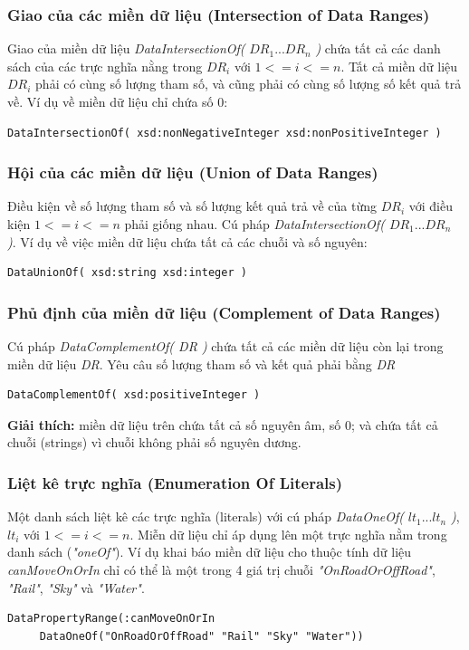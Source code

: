 \subsubsection{Giao của các miền dữ liệu (Intersection of Data Ranges)}
Giao của miền dữ liệu \textit{DataIntersectionOf(} $DR_{1} ... DR_{n}$ \textit{)}  chứa tất cả các danh sách của các trực nghĩa nằng trong $DR_{i}$ với $1 <= i <= n$. Tất cả miền dữ liệu $DR_{i}$ phải có cùng số lượng tham số, và cũng phải có cùng số lượng số kết quả trả về. Ví dụ về miền dữ liệu chỉ chứa số 0:
\begin{verbatim}
DataIntersectionOf( xsd:nonNegativeInteger xsd:nonPositiveInteger )
\end{verbatim}

\subsubsection{Hội của các miền dữ liệu (Union of Data Ranges)}
Điều kiện về số lượng tham số và số lượng kết quả trả về của từng $DR_{i}$ với điều kiện $1 <= i <= n$ phải giống nhau. Cú pháp \textit{DataIntersectionOf( $DR_{1} ... DR_{n}$ )}. Ví dụ về việc miền dữ liệu chứa tất cả các chuỗi và số nguyên:
\begin{verbatim}
DataUnionOf( xsd:string xsd:integer )
\end{verbatim}

\subsubsection{Phủ định của miền dữ liệu (Complement of Data Ranges)}
Cú pháp \textit{DataComplementOf( DR )} chứa tất cả các miền dữ liệu còn lại trong miền dữ liệu \textit{DR}. Yêu câu số lượng tham số và kết quả phải bằng \textit{DR}

\begin{verbatim}
DataComplementOf( xsd:positiveInteger )
\end{verbatim}
\textbf{Giải thích:} miền dữ liệu trên chứa tất cả số nguyên âm, số 0; và chứa tất cả chuỗi (strings) vì chuỗi không phải số nguyên dương.

\subsubsection{Liệt kê trực nghĩa (Enumeration Of Literals)}
Một danh sách liệt kê các trực nghĩa (literals) với cú pháp \textit{DataOneOf(} $lt_{1} ... lt_{n}$ \textit{)},  $lt_{i}$ với $1 <= i <= n$.  Miễn dữ liệu chỉ áp dụng lên một trực nghĩa nằm trong danh sách (\textit{"oneOf"}). Ví dụ khai báo miền dữ liệu cho thuộc tính dữ liệu \textit{canMoveOnOrIn} chỉ có thể là một trong 4 giá trị chuỗi \textit{"OnRoadOrOffRoad"}, \textit{"Rail"}, \textit{"Sky"} và \textit{"Water"}.
\begin{verbatim}
DataPropertyRange(:canMoveOnOrIn 
     DataOneOf("OnRoadOrOffRoad" "Rail" "Sky" "Water"))
\end{verbatim}

